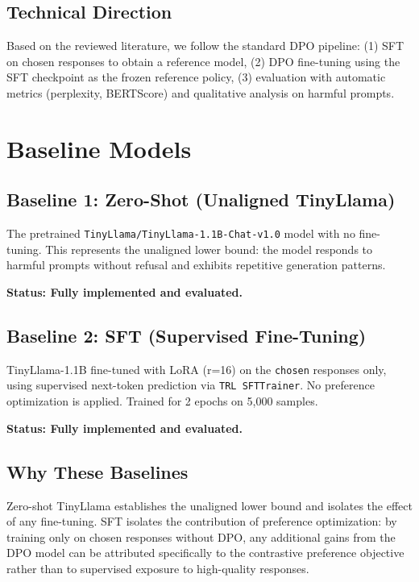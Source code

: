 \documentclass[12pt,a4paper]{article}
\begin{document}
\subsection*{Technical Direction}

Based on the reviewed literature, we follow the standard DPO pipeline:
(1) SFT on chosen responses to obtain a reference model,
(2) DPO fine-tuning using the SFT checkpoint as the frozen reference policy,
(3) evaluation with automatic metrics (perplexity, BERTScore) and qualitative
analysis on harmful prompts.

\section{Baseline Models}

\subsection*{Baseline 1: Zero-Shot (Unaligned TinyLlama)}

The pretrained \texttt{TinyLlama/TinyLlama-1.1B-Chat-v1.0} model with no fine-tuning.
This represents the unaligned lower bound: the model responds to harmful prompts
without refusal and exhibits repetitive generation patterns.

\textbf{Status: Fully implemented and evaluated.}

\subsection*{Baseline 2: SFT (Supervised Fine-Tuning)}

TinyLlama-1.1B fine-tuned with LoRA (r=16) on the \texttt{chosen} responses only,
using supervised next-token prediction via \texttt{TRL SFTTrainer}. No preference
optimization is applied. Trained for 2 epochs on 5,000 samples.

\textbf{Status: Fully implemented and evaluated.}

\subsection*{Why These Baselines}

Zero-shot TinyLlama establishes the unaligned lower bound and isolates the effect of
any fine-tuning. SFT isolates the contribution of preference optimization: by training
only on chosen responses without DPO, any additional gains from the DPO model can be
attributed specifically to the contrastive preference objective rather than to
supervised exposure to high-quality responses.
\end{document}
